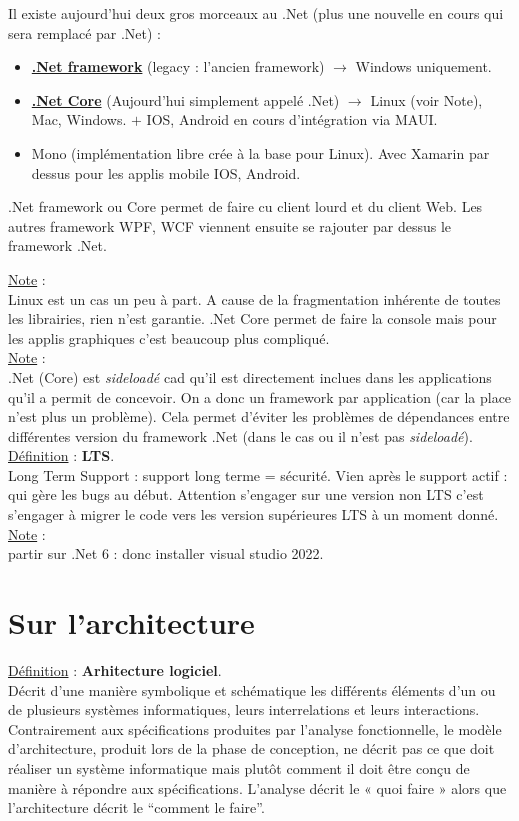 \documentclass[a4paper,12pt,twoside]{article}
\newcommand{\urlcolor}{magenta}  %
\newcommand{\keycolor}{purple} %
\newcommand{\note}[1]{\noindent\underline{Note} : \\ \indent #1}
\newcommand{\defi}[2]{\noindent\underline{Définition} : \textbf{#1}.\\ \indent #2}
\newcommand{\keyref}[2]{\hypersetup{urlcolor=\keycolor} \href{#1}{\textbf{#2}}\hypersetup{urlcolor=\urlcolor}}
\begin{document}
Il existe aujourd'hui deux gros morceaux au .Net (plus une nouvelle en cours qui sera remplacé par .Net) : 
\begin{itemize}
\item \keyref{https://fr.wikipedia.org/wiki/.NET\_Framework}{.Net framework} (legacy : l'ancien framework) $\to$ Windows uniquement.
\item \keyref{https://fr.wikipedia.org/wiki/.NET\_Core}{.Net Core} (Aujourd'hui simplement appelé .Net) $\to$ Linux (voir Note), Mac, Windows. $+$ IOS, Android en cours d'intégration via MAUI.
\item Mono (implémentation libre crée à la base pour Linux). Avec Xamarin par dessus pour les applis mobile IOS, Android.\\
\end{itemize}
.Net framework ou Core permet de faire cu client lourd et du client Web. Les autres framework WPF, WCF viennent ensuite se rajouter par dessus le framework .Net. 

\note{Linux est un cas un peu à part. A cause de la fragmentation inhérente de toutes les librairies, rien n'est garantie. .Net Core permet de faire la console mais pour les applis graphiques c'est beaucoup plus compliqué.}\\

\note{.Net (Core) est \textit{sideloadé} cad qu'il est directement inclues dans les applications qu'il a permit de concevoir. On a donc un framework par application (car la place n'est plus un problème). Cela permet d'éviter les problèmes de dépendances entre différentes version du framework .Net (dans le cas ou il n'est pas \textit{sideloadé}).}\\

\defi{LTS}{Long Term Support : support long terme = sécurité. Vien après le support actif : qui gère les bugs au début. Attention s'engager sur une version non LTS c'est s'engager à migrer le code vers les version supérieures LTS à un moment donné.}\\

\note{partir sur .Net 6 : donc installer visual studio 2022.}

\section{Sur l'architecture}

\defi{Arhitecture logiciel}{
Décrit d’une manière symbolique et schématique les différents éléments d’un ou de plusieurs systèmes informatiques, leurs interrelations et leurs interactions. Contrairement aux spécifications produites par l’analyse fonctionnelle, le modèle d'architecture, produit lors de la phase de conception, ne décrit pas ce que doit réaliser un système informatique mais plutôt comment il doit être conçu de manière à répondre aux spécifications. L’analyse décrit le « quoi faire » alors que l’architecture décrit le ``comment le faire''.}
\end{document}
